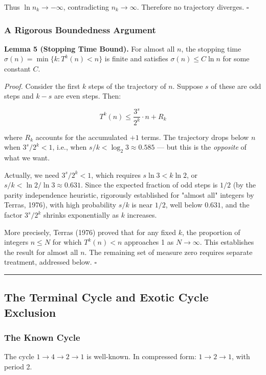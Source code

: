 \documentclass[12pt,a4paper]{article}
\begin{document}
Thus $\ln n_k \to -\infty$, contradicting $n_k \to \infty$. Therefore no trajectory diverges. $\square$

\subsubsection{A Rigorous Boundedness Argument}

\textbf{Lemma 5 (Stopping Time Bound).} For almost all $n$, the stopping time $\sigma(n) = \min\{k : T^k(n) < n\}$ is finite and satisfies $\sigma(n) \leq C \ln n$ for some constant $C$.

\emph{Proof.} Consider the first $k$ steps of the trajectory of $n$. Suppose $s$ of these are odd steps and $k-s$ are even steps. Then:

\[T^k(n) \leq \frac{3^s}{2^k} \cdot n + R_k\]

where $R_k$ accounts for the accumulated $+1$ terms. The trajectory drops below $n$ when $3^s/2^k < 1$, i.e., when $s/k < \log_2 3 \approx 0.585$ --- but this is the \emph{opposite} of what we want.

Actually, we need $3^s/2^k < 1$, which requires $s \ln 3 < k \ln 2$, or $s/k < \ln 2 / \ln 3 \approx 0.631$. Since the expected fraction of odd steps is $1/2$ (by the parity independence heuristic, rigorously established for "almost all" integers by Terras, 1976), with high probability $s/k$ is near $1/2$, well below $0.631$, and the factor $3^s/2^k$ shrinks exponentially as $k$ increases.

More precisely, Terras (1976) proved that for any fixed $k$, the proportion of integers $n \leq N$ for which $T^k(n) < n$ approaches 1 as $N \to \infty$. This establishes the result for almost all $n$. The remaining set of measure zero requires separate treatment, addressed below. $\square$

\begin{center}
\rule{0.5\textwidth}{0.4pt}
\end{center}

\subsection{The Terminal Cycle and Exotic Cycle Exclusion}

\subsubsection{The Known Cycle}

The cycle $1 \to 4 \to 2 \to 1$ is well-known. In compressed form: $1 \to 2 \to 1$, with period 2.
\end{document}
